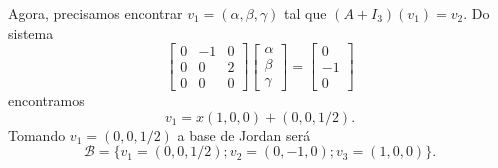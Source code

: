 \begin{enumerate}
\begin{solucao}
	Agora, precisamos encontrar $v_1 = (\alpha, \beta, \gamma)$ tal que $(A + I_3)(v_1) = v_2$. Do sistema
	\[
		\begin{bmatrix}
			0 & -1 & 0\\
			0 & 0 & 2\\
			0 & 0 & 0
		\end{bmatrix}\begin{bmatrix}
			\alpha\\
			\beta\\
			\gamma
		\end{bmatrix} = \begin{bmatrix}
			0\\
			-1\\
			0
		\end{bmatrix}
	\]
	encontramos
	\[
		v_1 = x(1,0,0) + (0,0,1/2).
	\]
	Tomando $v_1 = (0,0,1/2)$ a base de Jordan ser\'a
	\[
		\mathcal{B} = \{v_1 = (0,0,1/2); v_2 = (0,-1,0); v_3 = (1,0,0)\}.
	\]
	\end{solucao}
\end{enumerate}




